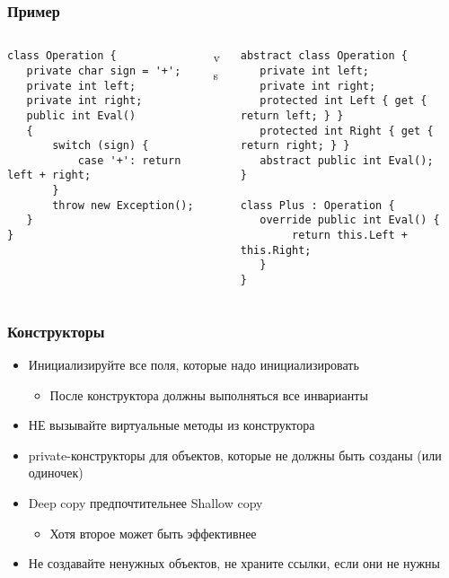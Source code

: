 \documentclass[xetex,mathserif,serif]{beamer}
\begin{document}
	\begin{frame}[fragile]
		\frametitle{Пример}
		\begin{footnotesize}
			\begin{columns}
				\begin{column}{0.35\textwidth}
					\begin{verbatim}
class Operation {
   private char sign = '+';
   private int left;
   private int right;
   public int Eval()
   {
       switch (sign) {
           case '+': return left + right;
       }
       throw new Exception();
   }
}
					\end{verbatim}
				\end{column}
				\begin{column}{0.1\textwidth}
					vs
				\end{column}
				\begin{column}{0.45\textwidth}
					\begin{verbatim}
abstract class Operation {
   private int left;
   private int right;
   protected int Left { get { return left; } }
   protected int Right { get { return right; } }
   abstract public int Eval();
}

class Plus : Operation {
   override public int Eval() { 
        return this.Left + this.Right; 
   }
}
					\end{verbatim}
				\end{column}
			\end{columns}
		\end{footnotesize}
\end{frame}

	\begin{frame}
		\frametitle{Конструкторы}
		\begin{itemize}
			\item Инициализируйте все поля, которые надо инициализировать
			\begin{itemize}
				\item После конструктора должны выполняться все инварианты
			\end{itemize}
			\item НЕ вызывайте виртуальные методы из конструктора
			\item private-конструкторы для объектов, которые не должны быть созданы (или одиночек)
			\item Deep copy предпочтительнее Shallow copy
			\begin{itemize}
				\item Хотя второе может быть эффективнее
			\end{itemize}
			\item Не создавайте ненужных объектов, не храните ссылки, если они не нужны
		\end{itemize}
	\end{frame}
\end{document}
